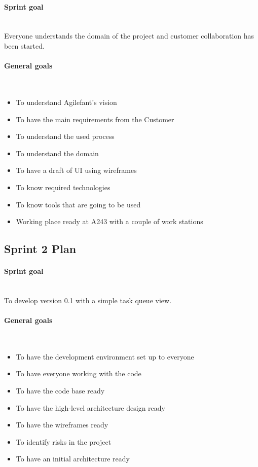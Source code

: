 \paragraph{Sprint goal}~\\
Everyone understands the domain of the project and customer collaboration has
been started. \checked

\paragraph{General goals}~
\begin{itemize}
  \item To understand Agilefant's vision \checked
  \item To have the main requirements from the Customer \checked
  \item To understand the used process \checked
  \item To understand the domain \checked
  \item To have a draft of UI using wireframes \checked
  \item To know required technologies \checked
  \item To know tools that are going to be used \checked
  \item Working place ready at A243 with a couple of work stations \checked
\end{itemize}

\subsection{Sprint 2 Plan}

\paragraph{Sprint goal}~\\
To develop version 0.1 with a simple task queue view.

\paragraph{General goals}~
\begin{itemize}
  \item To have the development environment set up to everyone \checked
  \item To have everyone working with the code \checked
  \item To have the code base ready
  \item To have the high-level architecture design ready \checked
  \item To have the wireframes ready \checked
  \item To identify risks in the project \checked
  \item To have an initial architecture ready \checked
\end{itemize}

